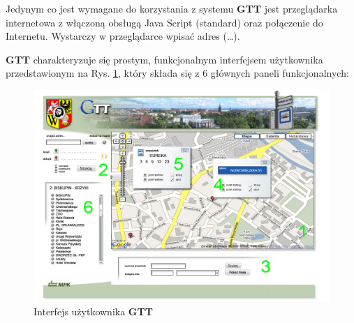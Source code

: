 \documentclass[a4paper,12pt]{article}
\begin{document}
 Jedynym co jest wymagane do korzystania z systemu \textbf{GTT} jest
 przeglądarka internetowa z włączoną obsługą Java Script (standard) oraz
 połączenie do Internetu. Wystarczy w przeglądarce wpisać adres (\ldots).

 \textbf{GTT} charakteryzuje się prostym, funkcjonalnym interfejsem
 użytkownika przedstawionym na Rys. \ref{interfejs_help}, który składa się z 6
 głównych paneli funkcjonalnych:
  \begin{figure}[htp]
\centering
\includegraphics[width=\textwidth]{interfejs_help} 
\caption{Interfejs użytkownika \textbf{GTT}}\label{interfejs_help}
\end{figure}
\end{document}
